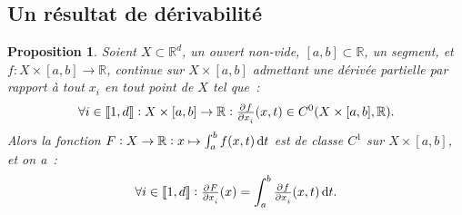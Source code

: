 \documentclass{report}
\newtheorem{prp}[thm]{Proposition}
\theoremstyle{definition}
\theoremstyle{remark}
\numberwithin{equation}{section}
\newcommand{\R}{\mathbb R}
\newcommand{\intint}[2]{\left\llbracket#1, #2\right\rrbracket}
\begin{document}
		\subsection{Un résultat de dérivabilité}
			\begin{prp}\label{prp:dérivabilitésegmentfixe} Soient $X \subset \R^d$, un ouvert non-vide, $[a, b] \subset \R$, un segment, et
			$f : X \times [a, b] \to \R$, continue sur $X \times [a, b]$ admettant une dérivée partielle par rapport à tout $x_i$ en tout point de $X$ tel que~:
			\begin{equation}
				\forall i \in \intint 1d : X \times [a, b] \to \R : \pd f{x_i}(x, t) \in C^0(X \times [a, b], \R).
			\end{equation}
			Alors la fonction $F : X \to \R : x \mapsto \int_a^b f(x, t)\dif t$ est de classe $C^1$ sur $X \times [a, b]$, et on a~:
			\begin{equation}
				\forall i \in \intint 1d : \pd F{x_i}(x) = \int_a^b \pd f{x_i}(x, t)\dif t.
			\end{equation}
			\end{prp}
\end{document}
